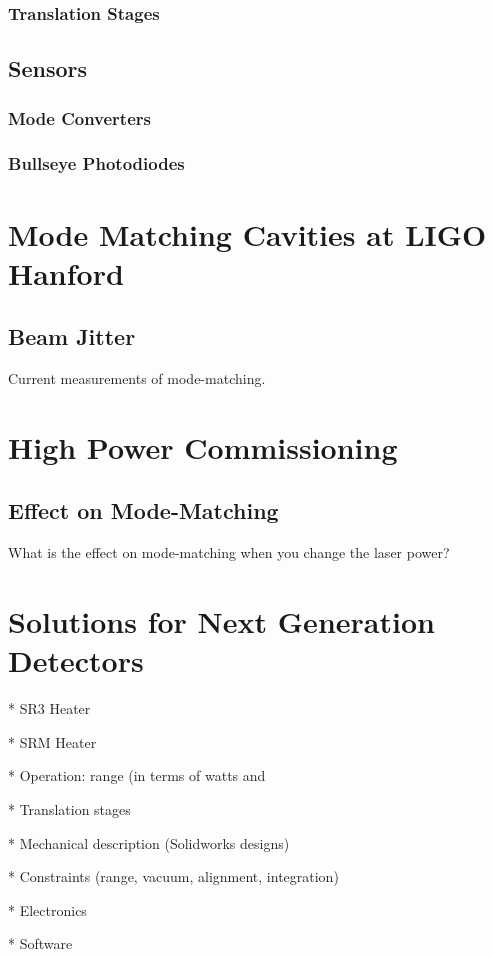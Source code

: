 \documentclass[10pt,a4paper]{book}
\begin{document}
		\subsection{Translation Stages}
		
	\section{Sensors}
		\subsection{Mode Converters}
		
		\subsection{Bullseye Photodiodes}

\chapter{Mode Matching Cavities at LIGO Hanford}
	\section{Beam Jitter}
	
Current measurements of mode-matching.

\chapter{High Power Commissioning}
	\section{Effect on Mode-Matching}
	What is the effect on mode-matching when you change the laser power?

\chapter{Solutions for Next Generation Detectors}

* SR3 Heater

* SRM Heater

* Operation: range (in terms of watts and %


* Translation stages

* Mechanical description (Solidworks designs)

* Constraints (range, vacuum, alignment, integration)

* Electronics 

* Software
	\listoffigures
	\listoftables
\end{document}
